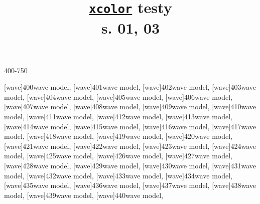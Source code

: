 \documentclass[a4paper,11pt]{article}
\title{\href{https://repo.skni.umcs.pl/ctan/macros/latex/contrib/xcolor/xcolor.pdf}{\texttt{xcolor}} testy \\
  s. 01, 03}
\author{}
\begin{document}





\maketitle %





400-750

\noindent
{}[wave]{400}{wave model},
[wave]{401}{wave model},
[wave]{402}{wave model},
[wave]{403}{wave model},
[wave]{404}{wave model},
[wave]{405}{wave model},
[wave]{406}{wave model}, \\[0.7em]
[wave]{407}{wave model},
[wave]{408}{wave model},
[wave]{409}{wave model},
[wave]{410}{wave model},
[wave]{411}{wave model},
[wave]{412}{wave model},
[wave]{413}{wave model}, \\[0.7em]
[wave]{414}{wave model},
[wave]{415}{wave model},
[wave]{416}{wave model},
[wave]{417}{wave model},
[wave]{418}{wave model},
[wave]{419}{wave model},
[wave]{420}{wave model}, \\[0.7em]
[wave]{421}{wave model},
[wave]{422}{wave model},
[wave]{423}{wave model},
[wave]{424}{wave model},
[wave]{425}{wave model},
[wave]{426}{wave model},
[wave]{427}{wave model}, \\[0.7em]
[wave]{428}{wave model},
[wave]{429}{wave model},
[wave]{430}{wave model},
[wave]{431}{wave model},
[wave]{432}{wave model},
[wave]{433}{wave model},
[wave]{434}{wave model}, \\[0.7em]
[wave]{435}{wave model},
[wave]{436}{wave model},
[wave]{437}{wave model},
[wave]{438}{wave model},
[wave]{439}{wave model},
[wave]{440}{wave model},
\end{document}

